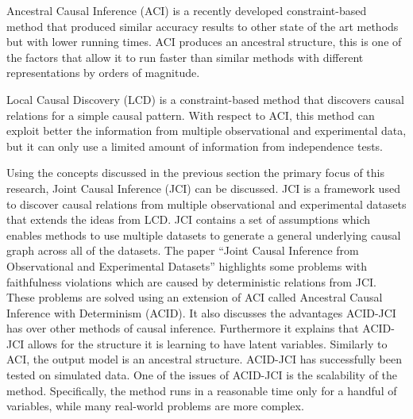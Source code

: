 \documentclass[11pt]{article}
\newcommand{\Sara}[1]{{\color{blue} Sara: #1}}
\begin{document}
Ancestral Causal Inference (ACI) \cite{aci} is a recently developed constraint-based method that produced similar accuracy results to other state of the art methods but with lower running times. ACI produces an ancestral structure, this is one of the factors that allow it to run faster than similar methods with different representations by orders of magnitude. 

Local Causal Discovery (LCD) \cite{cooper1999causal} is a constraint-based method that discovers causal relations for a simple causal pattern. With respect to ACI, this method can exploit better the information from multiple observational and experimental data, but it can only use a limited amount of information from independence tests.

Using the concepts discussed in the previous section the primary focus of this research, Joint Causal Inference (JCI) \cite{jci} can be discussed. JCI is a framework used to discover causal relations from multiple observational and experimental datasets that extends the ideas from LCD. JCI contains a set of assumptions which enables methods to use multiple datasets to generate a general underlying causal graph across all of the datasets.  The paper ``Joint Causal Inference from Observational and Experimental Datasets'' \cite{jci} highlights some problems with faithfulness violations which are caused by deterministic relations from JCI. These problems are solved using an extension of ACI called Ancestral Causal Inference with Determinism (ACID). It also discusses the advantages ACID-JCI has over other methods of causal inference. Furthermore it explains that ACID-JCI allows for the structure it is learning to have latent variables. Similarly to ACI, the output model is an ancestral structure. ACID-JCI has successfully been tested on simulated data. One of the issues of ACID-JCI is the scalability of the method. Specifically, the method runs in a reasonable time only for a handful of variables, while many real-world problems are more complex. 

\end{document}
